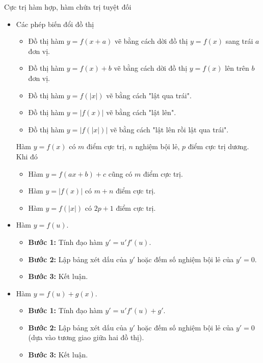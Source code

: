 \newpage\begin{dang}{Cực trị hàm hợp, hàm chứa trị tuyệt đối}
    \begin{itemize}
        \item Các phép biến đổi đồ thị
        \begin{itemize}
            \item Đồ thị hàm $y=f(x+a)$ vẽ bằng cách dời đồ thị $y=f(x)$ sang trái $a$ đơn vị.
            \item Đồ thị hàm $y=f(x)+b$ vẽ bằng cách dời đồ thị $y=f(x)$ lên trên $b$ đơn vị.
            \item Đồ thị hàm $y=f(|x|)$ vẽ bằng cách "lật qua trái".
            \item Đồ thị hàm $y=|f(x)|$ vẽ bằng cách "lật lên".
            \item Đồ thị hàm $y=|f(|x|)|$ vẽ bằng cách "lật lên rồi lật qua trái".
        \end{itemize}
        \begin{note} Hàm $y=f(x)$ có $m$ điểm cực trị, $n$ nghiệm bội lẻ, $p$ điểm cực trị dương. Khi đó
            \begin{itemize}
                \item[-]Hàm $y=f(ax+b)+c$ cũng có $m$ điểm cực trị.
                \item[-]	Hàm $y=|f(x)|$ có $m+n$  điểm cực trị.
                \item[-] 	Hàm $y=f(|x|)$ có $2p+1$  điểm cực trị.
            \end{itemize}
        \end{note}
        \item Hàm $y=f(u)$.
        \begin{itemize}
            \item \textbf{Bước 1: } Tính đạo hàm $y'=u'f'(u)$.
            \item \textbf{Bước 2: } Lập bảng xét dấu của $y'$ hoặc đếm số nghiệm bội lẻ của $y'=0$.
            \item \textbf{Bước 3: } Kết luận.
        \end{itemize}
        \item Hàm $y=f(u)+g(x)$.
        \begin{itemize}
            \item \textbf{Bước 1: } Tính đạo hàm $y'=u'f'(u)+g'$.
            \item \textbf{Bước 2: } Lập bảng xét dấu của $y'$ hoặc đếm số nghiệm bội lẻ của $y'=0$ (dựa vào tương giao giữa hai đồ thị).
            \item \textbf{Bước 3: } Kết luận.
        \end{itemize}
    \end{itemize}
\end{dang}
